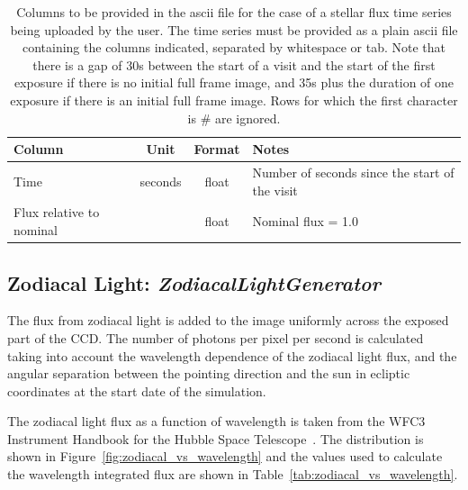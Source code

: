 \documentclass[11pt]{article}      %
\def\HCode#1{}
\def\htmlanchor#1{\HCode{<a id="#1"></a>}}
\begin{document}
\begin{table}[hb]
  \begin{center}
  \caption{Columns to be provided in the ascii file for the case of a stellar flux time series being uploaded by the user. The time series must be provided as a plain ascii file containing the columns indicated, separated by whitespace or tab. Note that there is a gap of 30s between the start of a visit and the start of the first exposure if there is no initial full frame image, and 35s plus the duration of one exposure if there is an initial full frame image. Rows for which the first character is \# are ignored.}
  \begin{tabular}{| l | c | c | l |}
    \hline
Column & Unit & Format & Notes\\
    \hline
Time & seconds & float & Number of seconds since the start of the visit\\
Flux relative to nominal & & float & Nominal flux = 1.0\\
    \hline
  \end{tabular}
  \label{tab:userFluxFormat}
\end{center}
\end{table}

\clearpage
\htmlanchor{ZodiacalLightGenerator}
\subsection{Zodiacal Light:  {\it ZodiacalLightGenerator}}
\label{sec:ZodiacalLightGenerator}

The flux from zodiacal light is added to the image uniformly across the exposed part of the CCD. The number of photons per pixel per second is calculated taking into account the wavelength dependence of the zodiacal light flux, and the angular separation between the pointing direction and the sun in ecliptic coordinates at the start date of the simulation.

The zodiacal light flux as a function of wavelength is taken from the WFC3 Instrument Handbook for the Hubble Space Telescope~\cite{HST_ETC}. The distribution is shown in Figure~\ref{fig:zodiacal_vs_wavelength} and the values used to calculate the wavelength integrated flux are shown in Table~\ref{tab:zodiacal_vs_wavelength}.
\end{document}
